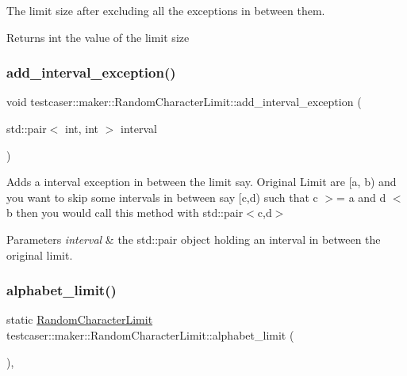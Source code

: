 The limit size after excluding all the exceptions in between them. 

\begin{DoxyReturn}{Returns}
int the value of the limit size 
\end{DoxyReturn}
\mbox{\label{classtestcaser_1_1maker_1_1RandomCharacterLimit_a9fac35205a15685a2ce671f9f38279ab}} 
\subsubsection{\texorpdfstring{add\+\_\+interval\+\_\+exception()}{add\_interval\_exception()}}
{\footnotesize\ttfamily void testcaser\+::maker\+::\+Random\+Character\+Limit\+::add\+\_\+interval\+\_\+exception (\begin{DoxyParamCaption}\item[{std\+::pair$<$ int, int $>$}]{interval }\end{DoxyParamCaption})\hspace{0.3cm}{\ttfamily [inline]}}



Adds a interval exception in between the limit say. Original Limit are \mbox{[}a, b) and you want to skip some intervals in between say \mbox{[}c,d) such that c $>$= a and d $<$ b then you would call this method with std\+::pair$<$c,d$>$ 


\begin{DoxyParams}{Parameters}
{\em interval} & the std\+::pair object holding an interval in between the original limit. \\
\hline
\end{DoxyParams}
\mbox{\label{classtestcaser_1_1maker_1_1RandomCharacterLimit_a4519263daf2737941039054c60c26ca5}} 
\subsubsection{\texorpdfstring{alphabet\+\_\+limit()}{alphabet\_limit()}}
{\footnotesize\ttfamily static \hyperlink{classtestcaser_1_1maker_1_1RandomCharacterLimit}{Random\+Character\+Limit} testcaser\+::maker\+::\+Random\+Character\+Limit\+::alphabet\+\_\+limit (\begin{DoxyParamCaption}{ }\end{DoxyParamCaption})\hspace{0.3cm}{\ttfamily [inline]}, {\ttfamily [static]}}



